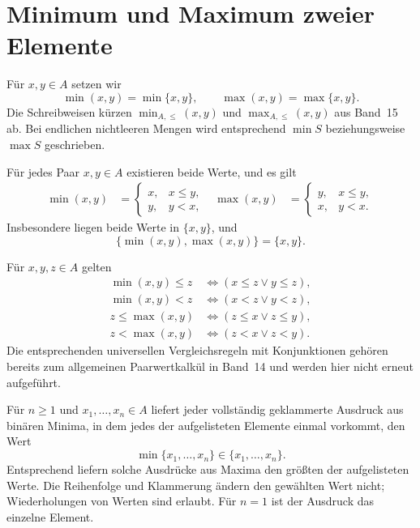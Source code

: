 \section{Minimum und Maximum zweier Elemente}

\begin{definition}
\label{b15guide:def:minmax}
Für $x,y\in A$ setzen wir
\[
 \min(x,y)=\min\{x,y\},\qquad
 \max(x,y)=\max\{x,y\}.
\]
Die Schreibweisen kürzen
$\min_{A,\leq}(x,y)$ und $\max_{A,\leq}(x,y)$ aus Band~15 ab.
Bei endlichen nichtleeren Mengen wird entsprechend $\min S$
beziehungsweise $\max S$ geschrieben.
\end{definition}

\begin{theorem}
\label{b15guide:thm:selection}
Für jedes Paar $x,y\in A$ existieren beide Werte, und es gilt
\[
\begin{aligned}
 \min(x,y)&=
 \begin{cases}x,&x\leq y,\\ y,&y<x,\end{cases}
&
 \max(x,y)&=
 \begin{cases}y,&x\leq y,\\ x,&y<x.\end{cases}
\end{aligned}
\]
Insbesondere liegen beide Werte in $\{x,y\}$, und
\[
 \{\min(x,y),\max(x,y)\}=\{x,y\}.
\]
\end{theorem}

\begin{theorem}
\label{b15guide:thm:or-comparisons}
Für $x,y,z\in A$ gelten
\[
\begin{aligned}
 \min(x,y)\leq z&\Longleftrightarrow(x\leq z\lor y\leq z),\\
 \min(x,y)<z&\Longleftrightarrow(x<z\lor y<z),\\
 z\leq\max(x,y)&\Longleftrightarrow(z\leq x\lor z\leq y),\\
 z<\max(x,y)&\Longleftrightarrow(z<x\lor z<y).
\end{aligned}
\]
Die entsprechenden universellen Vergleichsregeln mit
Konjunktionen gehören bereits zum allgemeinen Paarwertkalkül
in Band~14 und werden hier nicht erneut aufgeführt.
\end{theorem}

\begin{theorem}
\label{b15guide:thm:iterated}
Für $n\geq1$ und $x_1,\ldots,x_n\in A$ liefert jeder vollständig
geklammerte Ausdruck aus binären Minima, in dem jedes der
aufgelisteten Elemente einmal vorkommt, den Wert
\[
 \min\{x_1,\ldots,x_n\}\in\{x_1,\ldots,x_n\}.
\]
Entsprechend liefern solche Ausdrücke aus Maxima den größten
der aufgelisteten Werte. Die Reihenfolge und Klammerung ändern
den gewählten Wert nicht; Wiederholungen von Werten sind erlaubt.
Für $n=1$ ist der Ausdruck das einzelne Element.
\end{theorem}

